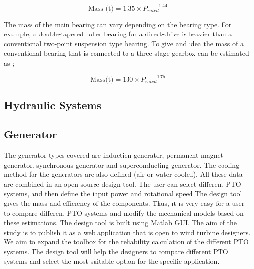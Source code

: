 \documentclass{article}
\begin{document}
\begin{equation}
	\text{Mass (t)} = 1.35 \times {P_{rated}}^{1.44}
\end{equation}


The mass of the main bearing can vary depending on the bearing type. For example, a double-tapered roller bearing for a direct-drive is heavier than a conventional two-point suspension type bearing. To give and idea the mass of a conventional bearing that is connected to a three-stage gearbox can be estimated as \cite{Fingersh2006};

\begin{equation}
	\text{Mass(t)} = 130 \times {P_{rated}}^{1.75}
\end{equation}

\subsection{Hydraulic Systems}

\subsection{Generator}
The generator types covered are induction generator, permanent-magnet generator, synchronous generator and superconducting generator. The cooling method for the generators are also defined (air or water cooled). 
All these data are combined in an open-source design tool. The user can select different PTO systems, and then define the input power and rotational speed The design tool gives the mass and efficiency of the components. Thus, it is very easy for a user to compare different PTO systems and modify the mechanical models based on these estimations. The design tool is built using Matlab GUI. The aim of the study is to publish it as a web application that is open to wind turbine designers. We aim to expand the toolbox for the reliability calculation of the different PTO systems. The design tool will help the designers to compare different PTO systems and select the most suitable option for the specific application.
\end{document}
